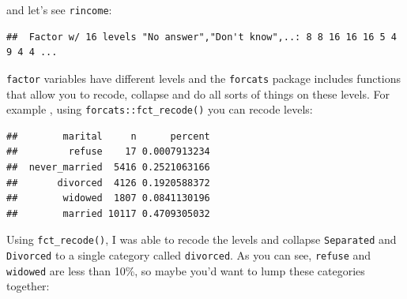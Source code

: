 \documentclass[]{gitbook}
\newenvironment{Shaded}{\begin{snugshade}}{\end{snugshade}}
\newcommand{\DataTypeTok}[1]{\textcolor[rgb]{0.13,0.29,0.53}{#1}}
\newcommand{\KeywordTok}[1]{\textcolor[rgb]{0.13,0.29,0.53}{\textbf{#1}}}
\newcommand{\NormalTok}[1]{#1}
\newcommand{\OperatorTok}[1]{\textcolor[rgb]{0.81,0.36,0.00}{\textbf{#1}}}
\newcommand{\StringTok}[1]{\textcolor[rgb]{0.31,0.60,0.02}{#1}}
\theoremstyle{definition}
\theoremstyle{definition}
\theoremstyle{definition}
\theoremstyle{remark}
\begin{document}
and let's see \texttt{rincome}:

\begin{Shaded}
\end{Shaded}

\begin{verbatim}
##  Factor w/ 16 levels "No answer","Don't know",..: 8 8 16 16 16 5 4 9 4 4 ...
\end{verbatim}

\texttt{factor} variables have different levels and the \texttt{forcats}
package includes functions that allow you to recode, collapse and do all
sorts of things on these levels. For example , using
\texttt{forcats::fct\_recode()} you can recode levels:

\begin{Shaded}
\end{Shaded}

\begin{verbatim}
##        marital     n      percent
##         refuse    17 0.0007913234
##  never_married  5416 0.2521063166
##       divorced  4126 0.1920588372
##        widowed  1807 0.0841130196
##        married 10117 0.4709305032
\end{verbatim}

Using \texttt{fct\_recode()}, I was able to recode the levels and
collapse \texttt{Separated} and \texttt{Divorced} to a single category
called \texttt{divorced}. As you can see, \texttt{refuse} and
\texttt{widowed} are less than 10\%, so maybe you'd want to lump these
categories together:
\end{document}
